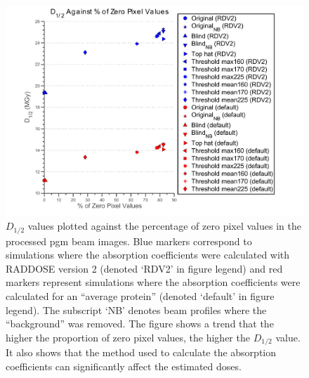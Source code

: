 \begin{figure}
  \centering
    \includegraphics[width=1\textwidth]{figures/beam/d_half_plot.pdf}
    \caption[$D_{1/2}$ values plotted against the percentage of zero pixel values in the processed pgm beam images.]{$D_{1/2}$ values plotted against the percentage of zero pixel values in the processed pgm beam images.
    Blue markers correspond to simulations where the absorption coefficients were calculated with RADDOSE version 2 (denoted `RDV2' in figure legend) and red markers represent simulations where the absorption coefficients were calculated for an ``average protein'' (denoted `default' in figure legend).
    The subscript `NB' denotes beam profiles where the ``background'' was removed.
    The figure shows a trend that the higher the proportion of zero pixel values, the higher the $D_{1/2}$ value.
    It also shows that the method used to calculate the absorption coefficients can significantly affect the estimated doses.}
    \label{figdhalf}
\end{figure}
